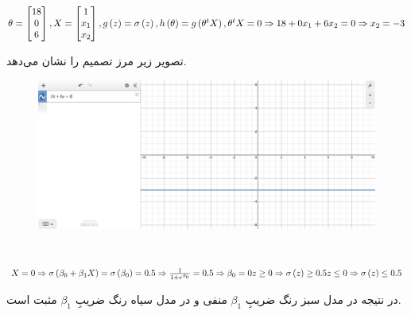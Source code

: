 \documentclass{article}
\begin{document}
\subsection{}
\begin{latin}
$
\theta = \begin{bmatrix}
18 \\
0 \\
6
\end{bmatrix}, \\
X = \begin{bmatrix}
1 \\
x_1\\
x_2
\end{bmatrix}, \\
g\left( z \right) = \sigma \left( z \right), \\
h\left( \theta \right) = g\left( \theta ^ t X \right),\\
\theta ^ t X = 0 \Rightarrow \\
18 + 0x_1 + 6x_2 = 0 \Rightarrow \\
x_2 = -3
$
\end{latin}
تصویر زیر مرز تصمیم را نشان می‌دهد.
\begin{figure}[H]
    \centering
    \includegraphics[width=1\textwidth]{figures/5.2.jpg}
    \caption
	{}
    \label{fig:fig1}
\end{figure}


\section{}%
\begin{latin}
$
X = 0 \Rightarrow \sigma\left( \beta_0 + \beta_1 X \right) = \sigma\left( \beta_0 \right) = 0.5 \\ \Rightarrow \frac{1}{1 + e ^ {\beta_0}} = 0.5 \\
\Rightarrow \beta_0 = 0 \\ \\
z \ge 0\Rightarrow  \sigma\left( z \right) \ge 0.5 \\
z \le 0\Rightarrow  \sigma\left( z \right) \le 0.5 \\
$
\end{latin}
در نتیجه در مدل سبز رنگ ضریبِ $\beta_1$ منفی و در مدل سیاه رنگ ضریبِ $\beta_1$ مثبت است.
\end{document}
